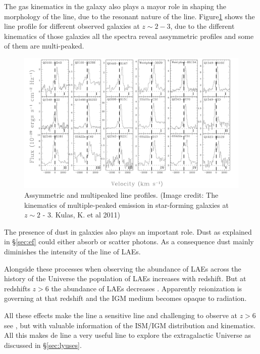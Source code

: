 The gas kinematics in the galaxy also plays a mayor role in shaping
the morphology of the line, due to the resonant nature of the line. 
Figure\ref{fig:kulas} shows the \ly line
profile for different observed galaxies at $z \sim 2 - 3$, due to the different
kinematics of those galaxies all the spectra reveal assymmetric profiles 
and some of them are multi-peaked.    


\begin{figure}[H]%
\begin{center}
\includegraphics[scale=0.4]{Figures/kulas.png}
\end{center}\caption{Assymmetric and multipeaked \ly line profiles. (Image credit: The kinematics of multiple-peaked \ly emission in star-forming galaxies at $z\sim 2$ - 3. Kulas, K. et al 2011)\label{fig:kulas}
 }
\end{figure}

The presence of dust in galaxies also plays an important role. Dust as explained
 in \S\ref{sec:ef} could either absorb or scatter \ly photons. As a 
consequence dust mainly diminishes the intensity of the \ly line of LAEs. 

Alongside these processes when observing the abundance of LAEs across
the history of the Universe the population of LAEs increases 
with redshift. But at redshifts $z>6$ the  
abundance of LAEs decreases \citep{Schenker12}. Apparently 
 reionization  is governing at that redshift and the IGM medium 
becomes opaque to \ly radiation.   

All these effects make the \ly line a sensitive line and challenging
to observe at $z>6$ see \citep{Sobral15}, but with valuable information
of the ISM/IGM distribution and kinematics. All this makes de \ly
line a very useful line to explore the extragalactic Universe as
discussed in \S\ref{sec:lyuses}.

